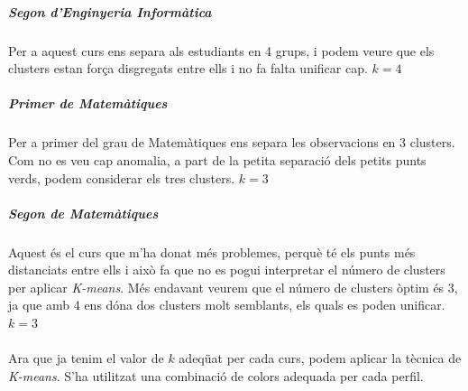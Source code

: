 \documentclass[12pt,a4paper,catalan]{article}
\begin{document}
\subparagraph{Segon d'Enginyeria Informàtica}
Per a aquest curs ens separa als estudiants en 4 grups, i podem veure que els clusters estan força disgregats entre ells i no fa falta unificar cap.  $k=4$

\subparagraph{Primer de Matemàtiques} 
Per a primer del grau de Matemàtiques ens separa les observacions en 3 clusters. Com no es veu cap anomalia, a part de la petita separació dels petits punts verds, podem considerar els tres clusters.  $k=3$

\subparagraph{Segon de Matemàtiques}
Aquest és el curs que m'ha donat més problemes, perquè té els punts més distanciats entre ells i això fa que no es pogui interpretar el número de clusters per aplicar \textit{K-means}. Més endavant veurem que el número de clusters òptim és 3, ja que amb 4 ens dóna dos clusters molt semblants, els quals es poden unificar. $k=3$
\\
\\
Ara que ja tenim el valor de $k$ adeqüat per cada curs, podem aplicar la tècnica de \textit{K-means}. S'ha utilitzat una combinació de colors adequada per cada perfil.
\end{document}
